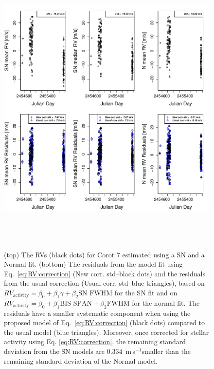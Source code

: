 \documentclass{aa}
\def\ms{\hbox{\,m\,s$^{-1}$}}         %
\begin{document}
\begin{figure} 
\begin{center}
\includegraphics[height = 6in]{NEW_CORRECTIONLRa01_E_[3]CorrectionActivity_RadialVelocity_vs_time.pdf} 
   \caption{(top) The RVs (black dots) for $\text{Corot }7$ estimated using a SN and a Normal fit.
 (bottom) The residuals from the model fit using Eq.~\eqref{eq:RV:correction} (New corr. std--black dots) and the residuals from the usual correction (Usual corr. std--blue triangles), based on $RV_{\text{activity}}=\beta_0+\beta_1 \gamma + \beta_2 \text{SN FWHM}$ for the SN fit and on $RV_{\text{activity}}=\beta_0+\beta_1 \text{BIS SPAN} + \beta_2 \text{FWHM}$ for the normal fit. The residuals have a smaller systematic component when using the proposed model of Eq.~\eqref{eq:RV:correction} (black dots) compared to the usual model (blue triangles). Moreover, once corrected for stellar activity using Eq. \ref{eq:RV:correction}, the remaining standard deviation from the SN models are $0.334$ \ms smaller than the remaining standard deviation of the Normal model.}
   \label{fig:Corot-7:correctionRV}
\end{center}
\end{figure}
\end{document}

